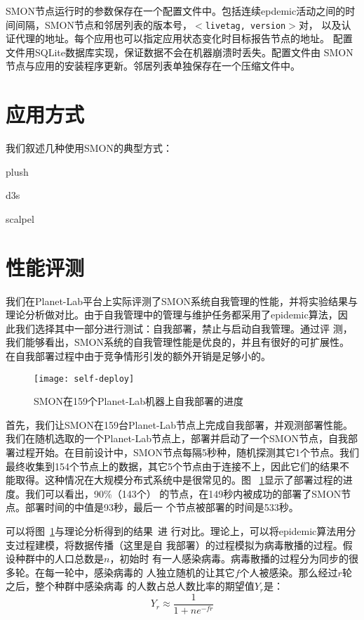 SMON节点运行时的参数保存在一个配置文件中。包括连续epdemic活动之间的时
间间隔，SMON节点和邻居列表的版本号，$<$\texttt{livetag, version}$>$对，
以及认证代理的地址。每个应用也可以指定应用状态变化时目标报告节点的地址。
配置文件用SQLite数据库实现，保证数据不会在机器崩溃时丢失。配置文件由
SMON节点与应用的安装程序更新。邻居列表单独保存在一个压缩文件中。


\section{应用方式}
\label{sec:smon_app}

我们叙述几种使用SMON的典型方式：

plush

d3s

scalpel

\section{性能评测}
\label{sec:smon_eval}

我们在Planet-Lab平台上实际评测了SMON系统自我管理的性能，并将实验结果与
理论分析做对比。由于自我管理中的管理与维护任务都采用了epidemic算法，因
此我们选择其中一部分进行测试：自我部署，禁止与启动自我管理。通过评
测，我们能够看出，SMON系统的自我管理性能是优良的，并且有很好的可扩展性。
在自我部署过程中由于竞争情形引发的额外开销是足够小的。

\begin{figure}
\centering
  \begin{minipage}{0.8\linewidth}
    \centering
    \texttt{[image: self-deploy]}
    \caption{SMON在159个Planet-Lab机器上自我部署的进度}
    \label{fig:self-deploy}
  \end{minipage}
\end{figure}

首先，我们让SMON在159台Planet-Lab节点上完成自我部署，并观测部署性能。
我们在随机选取的一个Planet-Lab节点上，部署并启动了一个SMON节点，自我部
署过程开始。在目前设计中，SMON节点每隔5秒种，随机探测其它1个节点。我们
最终收集到154个节点上的数据，其它5个节点由于连接不上，因此它们的结果不
能取得。这种情况在大规模分布式系统中是很常见的。图~
\ref{fig:self-deploy}显示了部署过程的进度。我们可以看出，90\%（143个）
的节点，在149秒内被成功的部署了SMON节点。部署时间的中值是93秒，最后一
个节点被部署的时间是533秒。


可以将图~\ref{fig:self-deploy}与理论分析得到的结果~\cite{Bailey1975}进
行对比。理论上，可以将epidemic算法用分支过程建模，将数据传播（这里是自
我部署）的过程模拟为病毒散播的过程。假设种群中的人口总数是$n$，初始时
有一人感染病毒。病毒散播的过程分为同步的很多轮。在每一轮中，感染病毒的
人独立随机的让其它$f$个人被感染。那么经过$r$轮之后，整个种群中感染病毒
的人数占总人数比率的期望值$Y_r$是：\begin{equation*} Y_r \approx
\frac{1}{1+ne^{-fr}} \end{equation*}

